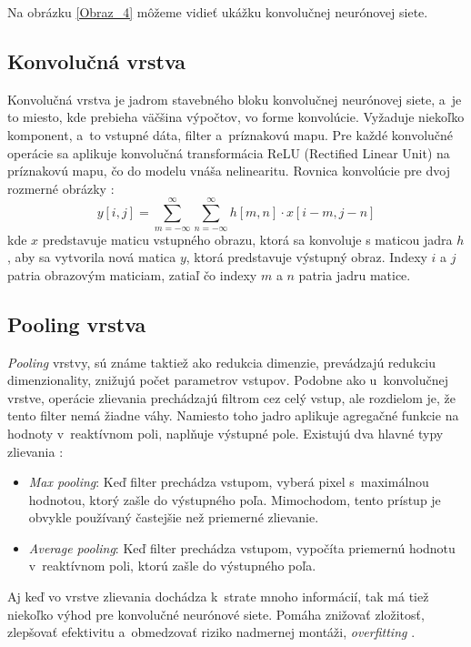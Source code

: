 Na obrázku \ref{Obraz_4} môžeme vidieť ukážku konvolučnej neurónovej siete.

\subsection{Konvolučná vrstva}
Konvolučná vrstva je jadrom stavebného bloku konvolučnej neurónovej siete, a~je to miesto, kde prebieha väčšina výpočtov, vo forme konvolúcie. Vyžaduje niekoľko komponent, a~to vstupné dáta, filter a~príznakovú mapu. Pre každé konvolučné operácie sa aplikuje konvolučná transformácia ReLU (Rectified Linear Unit) na príznakovú mapu, čo do modelu vnáša nelinearitu. Rovnica konvolúcie pre dvoj rozmerné obrázky \cite{convolutional_equation}:
\begin{equation}
    y[i,j] = \sum^{\infty}_{m=-\infty} \sum^{\infty}_{n=-\infty} h[m,n] \cdot x[i - m,j - n]
    \label{eq:rovnica1}
\end{equation}
kde $x$ predstavuje maticu vstupného obrazu, ktorá sa konvoluje s maticou jadra $h$, aby sa vytvorila nová matica $y$, ktorá predstavuje výstupný obraz. Indexy $i$ a $j$ patria obrazovým maticiam, zatiaľ čo indexy $m$ a $n$ patria jadru matice.

\subsection{Pooling vrstva}
\textit{Pooling} vrstvy, sú známe taktiež ako redukcia dimenzie, prevádzajú redukciu dimenzionality, znižujú počet parametrov vstupov. Podobne ako u~konvolučnej vrstve, operácie zlievania prechádzajú filtrom cez celý vstup, ale rozdielom je, že tento filter nemá žiadne váhy. Namiesto toho jadro aplikuje agregačné funkcie na hodnoty v~reaktívnom poli, naplňuje výstupné pole. Existujú dva hlavné typy zlievania \cite{IBM_CNN}:
\begin{itemize}
    \item \textit{Max pooling}: Keď filter prechádza vstupom, vyberá pixel s~maximálnou hodnotou, ktorý zašle do výstupného poľa. Mimochodom, tento prístup je obvykle používaný častejšie než priemerné zlievanie.
    \item \textit{Average pooling}: Keď filter prechádza vstupom, vypočíta priemernú hodnotu v~reaktívnom poli, ktorú zašle do výstupného poľa.
\end{itemize}
Aj keď vo vrstve zlievania dochádza k~strate mnoho informácií, tak má tiež niekoľko výhod pre konvolučné neurónové siete. Pomáha znižovať zložitosť, zlepšovať efektivitu a~obmedzovať riziko nadmernej montáži, \textit{overfitting} \cite{IBM_CNN}.


